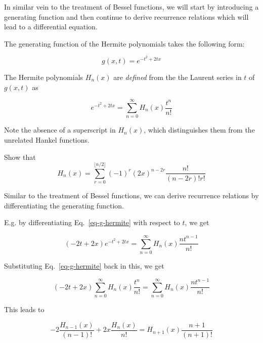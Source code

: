 In similar vein to the treatment of Bessel functions, we will start by introducing a generating function and then continue to derive recurrence relations which will lead to a differential equation.


The generating function of the Hermite polynomials takes the following form:

\begin{equation}
g(x,t) = e^{-t^2 + 2tx} \label{eq-gen-hermite}
\end{equation}

The Hermite polynomials $H_n(x)$ are \emph{defined} from the the Laurent series in $t$ of $g(x,t)$ as 

\begin{equation}
e^{-t^2 + 2tx}= \sum_{n = 0}^{\infty} H_n(x)\frac{t^n}{n!} \label{eq-g-hermite}
\end{equation} 

Note the absence of a superscript in $H_n(x)$, which distinguishes them from the unrelated Hankel functions.

\begin{sidebar}
\begin{ex}
Show that
$$H_n(x) = \sum_{r=0}^{\lfloor n/2 \rfloor}(-1)^r {(2x)}^{n-2r} \frac{n!}{(n-2r)! r!}$$
\end{ex}
\end{sidebar}


Similar to the treatment of Bessel functions, we can derive recurrence relations by differentiating the generating function.

E.g. by differentiating Eq.~\ref{eq-g-hermite} with respect to $t$, we get

\begin{equation}
(-2t+2x)e^{-t^2 + 2tx} = \sum_{n = 0}^{\infty} H_n(x) \frac{nt^{n-1}}{n!}
\end{equation} 

Substituting Eq.~\ref{eq-g-hermite} back in this, we get

\begin{equation}
(-2t+2x) \sum_{n = 0}^{\infty} H_n(x)\frac{t^n}{n!} = \sum_{n = 0}^{\infty} H_n(x) \frac{nt^{n-1}}{n!}
\end{equation} 

This leads to

\begin{equation}
-2  \frac{H_{n-1}(x)}{(n-1)!} + 2 x \frac{H_n(x)}{n!} = H_{n+1}(x) \frac{n+1}{(n+1)!}
\end{equation} 

